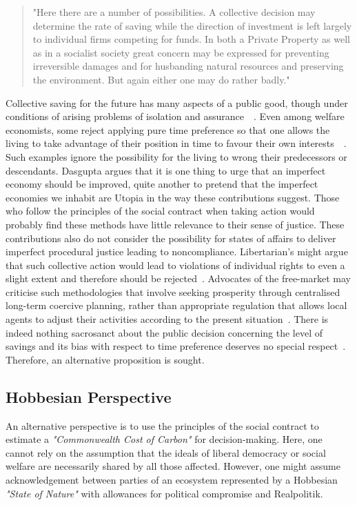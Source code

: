 \documentclass[11pt, oneside]{article}   	%
\begin{document}
\begin{quote}
"Here there are a number of possibilities. A collective decision may determine the rate of saving while the direction of investment is left largely to individual firms competing for funds. In both a Private Property as well as in a socialist society great concern may be expressed for preventing irreversible damages and for husbanding natural resources and preserving the environment. But again either one may do rather badly."~\cite{jr1}
\end{quote}

Collective saving for the future has many aspects of a public good, though under conditions of arising problems of isolation and assurance~\cite{as1}~\cite{ms1}.
Even among welfare economists, some reject applying pure time preference so that one allows the living to take advantage of their position in time to favour their own interests~\cite{hs1}~\cite{fr1}.
Such examples ignore the possibility for the living to wrong their predecessors or descendants.
Dasgupta argues that it is one thing to urge that an imperfect economy should be improved, quite another to pretend that the imperfect economies we inhabit are Utopia in the way these contributions suggest.
Those who follow the principles of the social contract when taking action would probably find these methods have little relevance to their sense of justice.
These contributions also do not consider the possibility for states of affairs to deliver imperfect procedural justice leading to noncompliance.
Libertarian's might argue that such collective action would lead to violations of individual rights to even a slight extent and therefore should be rejected~\cite{rn1}.
Advocates of the free-market may criticise such methodologies that involve seeking prosperity through centralised long-term coercive planning, rather than appropriate regulation that allows local agents to adjust their activities according to the present situation~\cite{fh1}.
There is indeed nothing sacrosanct about the public decision concerning the level of savings and its bias with respect to time preference deserves no special respect~\cite{jr1}.
Therefore, an alternative proposition is sought.\\

\subsection{Hobbesian Perspective}

An alternative perspective is to use the principles of the social contract to estimate a \emph{"Commonwealth Cost of Carbon"} for decision-making.
Here, one cannot rely on the assumption that the ideals of liberal democracy or social welfare are necessarily shared by all those affected.
However, one might assume acknowledgement between parties of an ecosystem represented by a Hobbesian \emph{"State of Nature"} with allowances for political compromise and Realpolitik.\\
\end{document}
